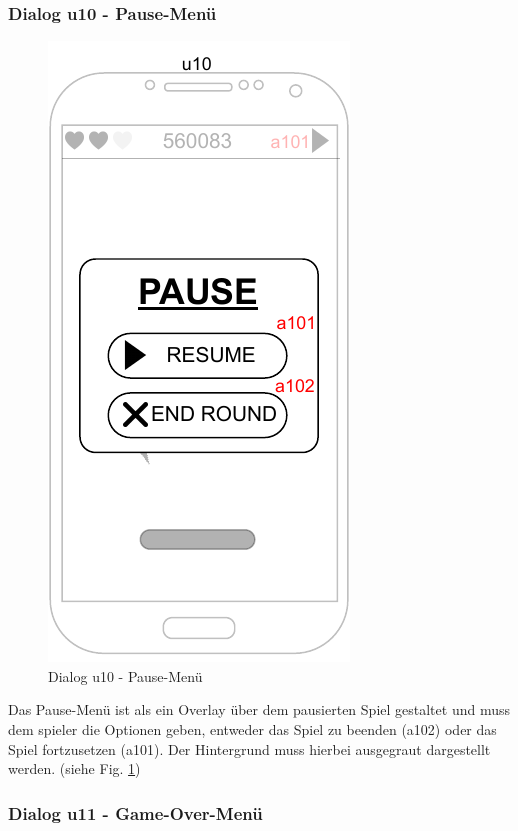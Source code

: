 \subsubsection{Dialog u10 - Pause-Menü}\label{dialog:pause}

\begin{figure}[h!]
    \begin{center}
    \includegraphics[scale=1.4]{diagramme/pdf/Mockup-u10.pdf}
    \end{center}
    \caption{Dialog u10 - Pause-Menü}\label{fig:dia:u10}
\end{figure}

Das Pause-Menü ist als ein Overlay über dem pausierten Spiel gestaltet und muss dem \gls{spieler} die Optionen geben, entweder das Spiel zu beenden (a102) oder das Spiel fortzusetzen (a101).
Der Hintergrund muss hierbei ausgegraut dargestellt werden.
(siehe Fig. \ref{fig:dia:u10})

\clearpage

\subsubsection{Dialog u11 - Game-Over-Menü} \label{subsec:u11-gameOverMenu}

